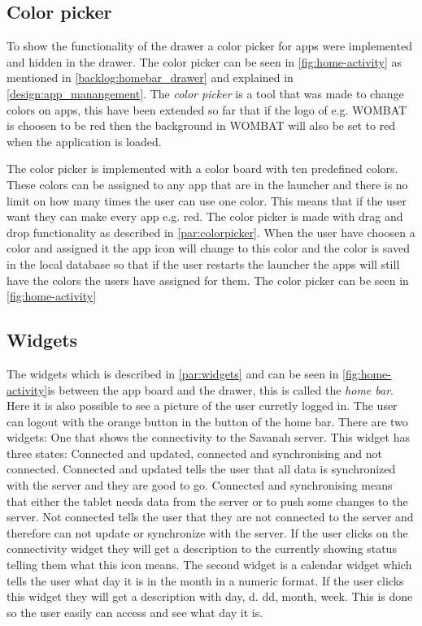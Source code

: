 \subsection{Color picker}
\label{home:colorpicker}
To show the functionality of the drawer a color picker for apps were implemented and hidden in the drawer. The color picker can be seen in \autoref{fig:home-activity} as mentioned in \autoref{backlog:homebar_drawer} and explained in \autoref{design:app_manangement}.
The \textit{color picker} is a tool that was made to change colors on apps, this have been extended so far that if the logo of e.g. WOMBAT is choosen to be red then the background in WOMBAT will also be set to red when the application is loaded.

The color picker is implemented with a color board with ten predefined \giraf[] colors. These colors can be assigned to any app that are in the launcher and there is no limit on how many times the user can use one color. This means that if the user want they can make every app e.g. red.
The color picker is made with drag and drop functionality as described in \autoref{par:colorpicker}. When the user have choosen a color and assigned it the app icon will change to this color and the color is saved in the local database so that if the user restarts the launcher the apps will still have the colors the users have assigned for them. 
The color picker can be seen in \autoref{fig:home-activity}

\subsection{Widgets}
The widgets which is described in \autoref{par:widgets} and can be seen in \autoref{fig:home-activity}is between the app board and the drawer, this is called the \textit{home bar}. Here it is also possible to see a picture of the user curretly logged in. The user can logout with the orange button in the button of the home bar. There are two widgets: One that shows the connectivity to the Savanah server. This widget has three states: Connected and updated, connected and synchronising and not connected. Connected and updated tells the user that all data is synchronized with the server and they are good to go. Connected and synchronising means that either the tablet needs data from the server or to push some changes to the server. Not connected tells the user that they are not connected to the server and therefore can not update or synchronize with the server.
If the user clicks on the connectivity widget they will get a description to the currently showing status telling them what this icon means.
The second widget is a calendar widget which tells the user what day it is in the month in a numeric format. If the user clicks this widget they will get a description with day, d. dd, month, week. This is done so the user easily can access and see what day it is.


\begin{lstlisting}[style=sourceCode, language=JAVA, caption=This is code, label=lst:homeActivity] 
\end{lstlisting}
